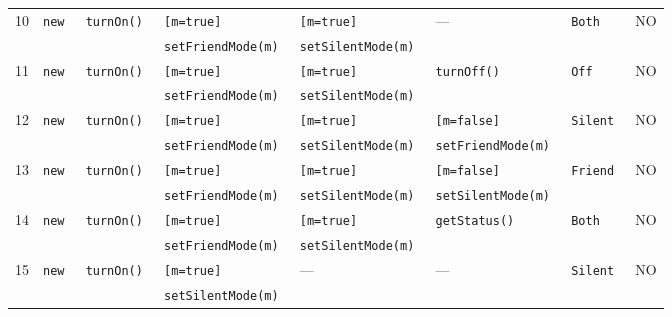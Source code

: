 \begin{table}[ht]
\begin{tabular}{|c|*{7}{l|}}
    10 & \tt new & \tt turnOn() & \tt [m=true]         & \tt [m=true] & --- & \tt Both & NO \\
       &         &              & \tt setFriendMode(m) & \tt setSilentMode(m) &&& \\ \hline
    11 & \tt new & \tt turnOn() & \tt [m=true]         & \tt [m=true] & \tt turnOff() & \tt Off & NO \\
       &         &              & \tt setFriendMode(m) & \tt setSilentMode(m) &&& \\ \hline
    12 & \tt new & \tt turnOn() & \tt [m=true]         & \tt [m=true]         & \tt [m=false] & \tt Silent & NO \\
       &         &              & \tt setFriendMode(m) & \tt setSilentMode(m) & \tt setFriendMode(m) && \\ \hline
    13 & \tt new & \tt turnOn() & \tt [m=true]         & \tt [m=true]         & \tt [m=false] & \tt Friend & NO \\
       &         &              & \tt setFriendMode(m) & \tt setSilentMode(m) & \tt setSilentMode(m) && \\ \hline
    14 & \tt new & \tt turnOn() & \tt [m=true]         & \tt [m=true] & \tt getStatus() & \tt Both & NO \\
       &         &              & \tt setFriendMode(m) & \tt setSilentMode(m) &&& \\ \hline
    
    15 & \tt new & \tt turnOn() & \tt [m=true] & --- & --- & \tt Silent & NO \\
       &         &              & \tt setSilentMode(m) &&&& \\ \hline
    

\end{tabular}
\end{table}
